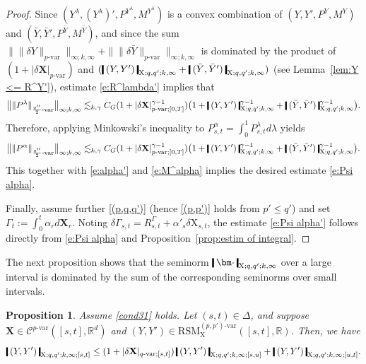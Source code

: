 \documentclass[11pt,reqno]{amsart}
\newtheorem{proposition}[lemma]{Proposition}
\numberwithin{equation}{section}
\def\R{\mathbb R}
\newcommand{\shortthickbar}{%
  \vcenter{\hbox{\rule{1.8pt}{2.2ex}}}%
}
\newcommand{\thicknm}[1]{%
  \mathopen{\shortthickbar}%
  \mkern4mu #1 \mkern4mu%
  \mathclose{\shortthickbar}%
}
\begin{document}
\begin{proof}
Since $(Y^{\lambda},(Y^{\lambda})',P^{Y^{\lambda}},M^{Y^{\lambda}})$ is a convex combination of $(Y,Y',P^Y,M^{Y})$ and $(\bar Y,\bar Y',P^{\bar Y},M^{\bar Y})$, and since the sum $\| \|\delta Y\|_{p\text{-}\mathrm{var}} \|_{\infty;k,\infty} + \| \|\delta \bar Y\|_{p\text{-}\mathrm{var}} \|_{\infty;k,\infty}$ is dominated by the product of $(1 + |\delta \mathbf X|_{p\text{-}\mathrm{var}})$ and $(\thicknm{(Y,Y')}_{\mathrm X;q,q';k,\infty} + \thicknm{(\bar Y,\bar Y')}_{\mathrm X;q,q';k,\infty})$ (see Lemma~\ref{lem:Y <= R^Y'}), estimate \eqref{e:R^lambda'} implies that 
\begin{equation*}
\big\| \|P^{\lambda}\|_{\frac{q''}{2}\text{-}\mathrm{var}} \big\|_{\infty;k,\infty} \lesssim_{k,\gamma} C_G (1 + |\delta \mathbf X|^{\gamma - 1}_{p\text{-}\mathrm{var};[0,T]}) \big( 1 +  \thicknm{(Y,Y')}_{\mathrm X;q,q';k,\infty}^{\gamma - 1} + \thicknm{(\bar Y,\bar Y')}_{\mathrm X;q,q';k,\infty}^{\gamma - 1} \big).
\end{equation*}
Therefore, applying Minkowski's inequality to $P^{\alpha}_{s,t} = \int_{0}^{1} P^{\lambda}_{s,t} d\lambda$ yields  
\begin{equation*}
\big\| \|P^{\alpha}\|_{\frac{q''}{2}\text{-}\mathrm{var}} \big\|_{\infty;k,\infty} \lesssim_{k,\gamma} C_G (1 + |\delta \mathbf X|^{\gamma - 1}_{p\text{-}\mathrm{var};[0,T]}) \big( 1 +  \thicknm{(Y,Y')}_{\mathrm X;q,q';k,\infty}^{\gamma - 1} + \thicknm{(\bar Y,\bar Y')}_{\mathrm X;q,q';k,\infty}^{\gamma - 1} \big).
\end{equation*}
This together with \eqref{e:alpha'} and \eqref{e:M^alpha} implies the desired estimate \eqref{e:Psi alpha}. 

Finally, assume further \ref{(p,q,q')} (hence \ref{(p,p')} holds from $p' \le q'$) and set $\Gamma_{t} := \int_{0}^{t}\alpha_r d\mathbf X_r$. Noting  $\delta\Gamma_{s,t} = R^{\Gamma}_{s,t} + \alpha'_{s} \delta \mathrm X_{s,t}$, the estimate \eqref{e:Psi alpha'} follows directly from \eqref{e:Psi alpha} and Proposition~\ref{prop:estim of integral}.
\end{proof}




The next proposition shows that the seminorm $\thicknm{\bm\cdot}_{\mathrm X;q,q';k,\infty}$ over a large interval is dominated by the sum of the corresponding seminorms over small intervals.

\begin{proposition}\label{prop:Psi <= Psi + Psi}
Assume \eqref{cond31} holds. Let $(s,t) \in \Delta$, and suppose $\mathbf X \in \mathscr C^{p\text{-}\mathrm{var}}([s,t],\R^d)$ and $(Y,Y') \in \mathrm{RSM}^{(p,p')\text{-}\mathrm{var}}_{\mathrm X}([s,t],\R)$. Then, we have 
\begin{equation}\label{e:Psi <= Psi + Psi}
\thicknm{(Y,Y')}_{\mathrm X;q,q';k,\infty;[s,t]} \le  (1 + |\delta \mathbf X|_{q\text{-}\mathrm{var};[s,t]})\, \thicknm{(Y,Y')}_{\mathrm X;q,q';k,\infty;[s,u]} + \thicknm{(Y,Y')}_{\mathrm X;q,q';k,\infty;[u,t]}.
\end{equation}
\end{proposition}
\end{document}
